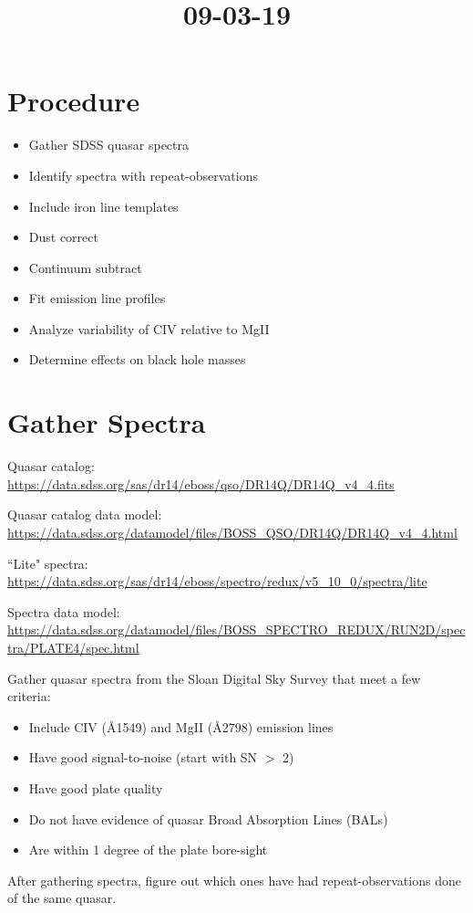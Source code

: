 \documentclass[12pt]{article}
\begin{document}
\title{09-03-19}
\author{}
\maketitle
    \section{Procedure}
        \begin{itemize}
            \item Gather SDSS quasar spectra
            \item Identify spectra with repeat-observations
            \item Include iron line templates
            \item Dust correct
            \item Continuum subtract
            \item Fit emission line profiles
            \item Analyze variability of CIV relative to MgII
            \item Determine effects on black hole masses
        \end{itemize}

    \section{Gather Spectra}
        Quasar catalog: \url{https://data.sdss.org/sas/dr14/eboss/qso/DR14Q/DR14Q_v4_4.fits}

        Quasar catalog data model: \url{https://data.sdss.org/datamodel/files/BOSS_QSO/DR14Q/DR14Q_v4_4.html}

        ``Lite" spectra: \url{https://data.sdss.org/sas/dr14/eboss/spectro/redux/v5_10_0/spectra/lite}

        Spectra data model: \url{https://data.sdss.org/datamodel/files/BOSS_SPECTRO_REDUX/RUN2D/spectra/PLATE4/spec.html}

        Gather quasar spectra from the Sloan Digital Sky Survey that meet a few criteria:
        \begin{itemize}
            \item Include CIV (\AA 1549) and MgII (\AA 2798) emission lines
            \item Have good signal-to-noise (start with SN $>$ 2)
            \item Have good plate quality
            \item Do not have evidence of quasar Broad Absorption Lines (BALs)
            \item Are within 1 degree of the plate bore-sight
        \end{itemize}

        After gathering spectra, figure out which ones have had repeat-observations done of the same quasar.
\end{document}
